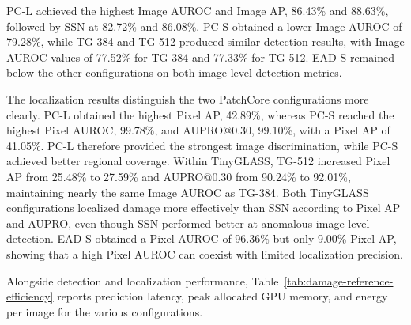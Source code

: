 PC-L achieved the highest Image AUROC and Image AP, 86.43\% and 88.63\%, followed by SSN at 82.72\% and 86.08\%. PC-S obtained a lower Image AUROC of 79.28\%, while TG-384 and TG-512 produced similar detection results, with Image AUROC values of 77.52\% for TG-384 and 77.33\% for TG-512. EAD-S remained below the other configurations on both image-level detection metrics.

The localization results distinguish the two PatchCore configurations more clearly. PC-L obtained the highest Pixel AP, 42.89\%, whereas PC-S reached the highest Pixel AUROC, 99.78\%, and AUPRO@0.30, 99.10\%, with a Pixel AP of 41.05\%. PC-L therefore provided the strongest image discrimination, while PC-S achieved better regional coverage. Within TinyGLASS, TG-512 increased Pixel AP from 25.48\% to 27.59\% and AUPRO@0.30 from 90.24\% to 92.01\%, maintaining nearly the same Image AUROC as TG-384. Both TinyGLASS configurations localized damage more effectively than SSN according to Pixel AP and AUPRO, even though SSN performed better at anomalous image-level detection. EAD-S obtained a Pixel AUROC of 96.36\% but only 9.00\% Pixel AP, showing that a high Pixel AUROC can coexist with limited localization precision.

Alongside detection and localization performance, Table~\ref{tab:damage-reference-efficiency} reports prediction latency, peak allocated GPU memory, and energy per image for the various configurations.

